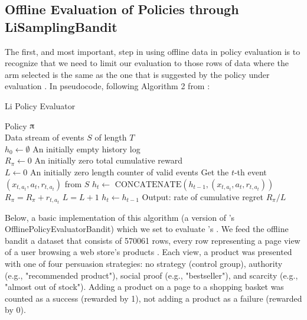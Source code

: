\documentclass{jss}
\begin{document}
\subsection{Offline Evaluation of Policies through LiSamplingBandit} \label{offli}

The first, and most important, step in using offline data in policy evaluation is to recognize that we need to limit our evaluation to those rows of data where the arm selected is the same as the one that is suggested by the policy under evaluation \citep{Li2012,Li2011}. In pseudocode, following Algorithm 2 from \cite{Li2011}:

\begin{algorithm}[H]
\caption{Li Policy Evaluator}
\label{Alg:LiBandit}
\begin{algorithmic}
\REQUIRE  Policy $\piup$ \\
                 Data stream of events $S$ of length $T$  \\
                 $h_0 \leftarrow \emptyset$ {An initially empty history log}\\
                 $R_\pi \leftarrow 0$ {An initially zero total cumulative reward}\\
                 $L \leftarrow 0$ {An initially zero length counter of valid events}
	\STATE Get the $t$-th event \( (x_{t,a_t},a_{t},r_{t,a_t}) \) from  $S$
	       \STATE $h_{t} \leftarrow $  \(\textrm{CONCATENATE}\left( h_{t-1},(x_{t,a_t},a_{t},r_{t,a_t})  \right)\)
	       \STATE $R_\pi = R_\pi + r_{t,a_t}$
	       \STATE $L = L + 1$
	\ELSE
	        \STATE $h_{t} \leftarrow  h_{t-1} $
	\ENDIF
\ENDFOR
\STATE Output: rate of cumulative regret $R_\pi / L $
\end{algorithmic}
\end{algorithm}

Below, a basic implementation of this algorithm (a version of 's  OfflinePolicyEvaluatorBandit) which we set to evaluate 's . We feed the offline bandit a dataset that consists of 570061 rows, every row representing a page view of a user browsing a web store's products \citep{Kaptein2018}. Each view, a product was presented with one of four persuasion strategies: no strategy (control group), authority (e.g., "recommended product"), social proof (e.g., "bestseller"), and scarcity (e.g., "almost out of stock"). Adding a product on a page to a shopping basket was counted as a success (rewarded by 1), not adding a product as a failure (rewarded by 0).
\end{document}
